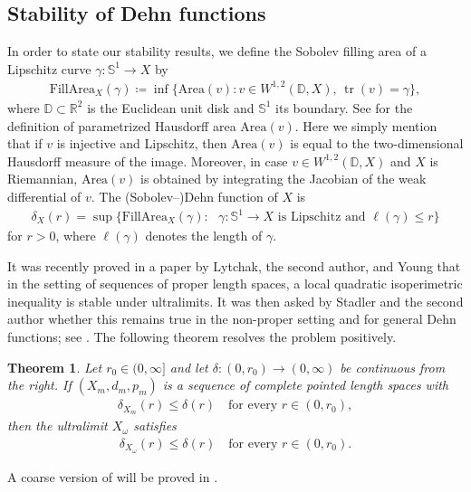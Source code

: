\documentclass[a4paper,leqno]{amsart}
\numberwithin{equation}{section}
\newtheorem{theorem}{Theorem}[section]
\theoremstyle{remark}
\theoremstyle{remark}
\DeclareMathOperator{\trace}{tr}
\begin{document}
\subsection{Stability of Dehn functions}
In order to state our stability results, we define the Sobolev filling area of a Lipschitz curve $\gamma \colon \mathbb{S}^1 \to X$ by
\begin{align*}
    \mathrm{FillArea}_X( \gamma ) \coloneqq \inf\{ \mathrm{Area}(v) \colon v \in W^{1,2}( \mathbb{D}, X ), \, \trace(v) = \gamma \},
\end{align*}
where $\mathbb{D} \subset \mathbb{R}^2$ is the Euclidean unit disk and $\mathbb{S}^1$ its boundary. See  for the definition of parametrized Hausdorff area $\mathrm{Area}(v)$. Here we simply mention that if $v$ is injective and Lipschitz, then $\mathrm{Area}(v)$ is equal to the two-dimensional Hausdorff measure of the image. Moreover, in case  $v \in W^{1,2}( \mathbb{D}, X )$ and $X$ is Riemannian, $\mathrm{Area}(v)$ is obtained by integrating the Jacobian of the weak differential of $v$. The (Sobolev--)Dehn function of $X$ is 
\begin{align*}
    \delta_{X}(r) = \sup\{ \mathrm{FillArea}_X(\gamma) \colon \text{ $\gamma \colon \mathbb{S}^1 \to X$ is Lipschitz and $\ell(\gamma) \leq r$} \}
\end{align*}
for $r > 0$, where $\ell( \gamma )$ denotes the length of $\gamma$. 

It was recently proved in a paper by Lytchak, the second author, and Young \cite{Lyt:Wen:You:20} that in the setting of sequences of proper length spaces, a local quadratic isoperimetric inequality is stable under ultralimits. It was then asked by Stadler and the second author whether this remains true in the non-proper setting and for general Dehn functions; see \cite[Problem 1]{stadler-wenger-2025-isoperimetric-inequalities-vs-upper-curvature-bounds}. The following theorem resolves the problem positively.
\begin{theorem}\label{theorem-stability-dehn-function}
Let $r_0 \in (0,\infty]$ and let $\delta \colon (0,r_0) \to (0,\infty)$ be continuous from the right. If $( X_m, d_m, p_m )$ is a sequence of complete pointed length spaces with
\begin{align*}
    \delta_{X_m}(r) \leq \delta(r)
    \quad\text{for every $r \in (0, r_0)$},
\end{align*}
then the ultralimit $X_\omega$ satisfies
\begin{align*}
    \delta_{X_\omega}( r ) \leq \delta(r)
    \quad\text{for every $r \in (0,r_0)$.}
\end{align*}
\end{theorem}
A coarse version of  will be proved in .
\end{document}
